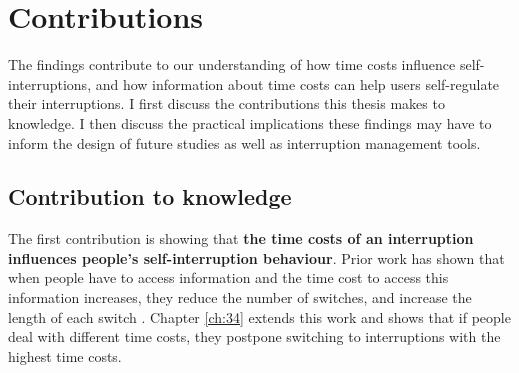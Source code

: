 \section{Contributions}
The findings contribute to our understanding of how time costs influence self-interruptions, and how information about time costs can help users self-regulate their interruptions. I first discuss the contributions this thesis makes to knowledge. I then discuss the practical implications these findings may have to inform the design of future studies as well as interruption management tools. 






\subsection{Contribution to knowledge}
The first contribution is showing that \textbf{the time costs of an interruption influences people’s self-interruption behaviour}. Prior work has shown that when people have to access information and the time cost to access this information increases, they reduce the number of switches, and increase the length of each switch \citep{Gray2006}. Chapter \ref{ch:34} extends this work and shows that if people deal with different time costs, they postpone switching to interruptions with the highest time costs. 

